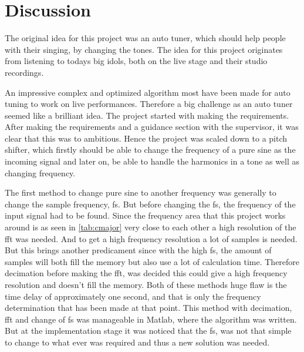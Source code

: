
\chapter{Discussion}

The original idea for this project was an auto tuner, which should help people with their singing, by changing the tones.
The idea for this project originates from listening to todays big idols, both on the live stage and their studio recordings. 

An impressive complex and optimized algorithm most have been made for auto tuning to work on live performances. 
Therefore a big challenge as an auto tuner seemed like a brilliant idea. 
The project started with making the requirements. 
After making the requirements and a guidance section with the supervisor, it was clear that this was to ambitious. 
Hence the project was scaled down to a pitch shifter, which firstly should be able to change the frequency of a pure sine as the incoming signal and later on, be able to handle the harmonics in a tone as well as changing frequency.

The first method to change pure sine to another frequency was generally to change the sample frequency, fs. 
But before changing the fs, the frequency of the input signal had to be found. 
Since the frequency area that this project works around is as seen in \cref{tab:cmajor} very close to each other a high resolution of the fft was needed. 
And to get a high frequency resolution a lot of samples is needed. 
But this brings another predicament since with the high fs, the amount of samples will both fill the memory but also use a lot of calculation time. 
Therefore decimation before making the fft, was decided this could give a high frequency resolution and doesn't fill the memory. 
Both of these methods huge flaw is the time delay of approximately one second, and that is only the frequency determination that has been made at that point. 
This method with decimation, fft and change of fs was manageable in Matlab, where the algorithm was written. 
But at the implementation stage it was noticed that the fs, was not that simple to change to what ever was required and thus a new solution was needed. 

